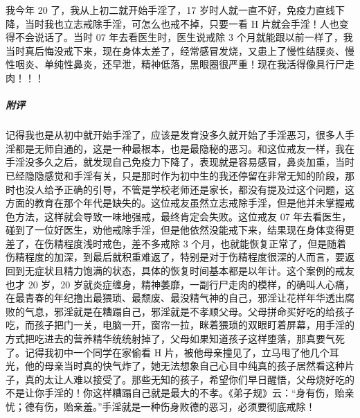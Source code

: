 \begin{case}
    我今年 20 了，我从上初二就开始手淫了，17 岁时人就一直不好，免疫力直线下降，当时我也立志戒除手淫，可怎么也戒不掉，只要一看 H 片就会手淫！人也变得不会说话了。当时 07 年去看医生时，医生说戒除 3 个月就能跟以前一样了，我当时真后悔没戒下来，现在身体太差了，经常感冒发烧，又患上了慢性结膜炎、慢性咽炎、单纯性鼻炎，还早泄，精神低落，黑眼圈很严重！现在我活得像具行尸走肉！！！
    \subparagraph{附评} 记得我也是从初中就开始手淫了，应该是发育没多久就开始了手淫恶习，很多人手淫都是无师自通的，这是一种最根本，也是最隐秘的恶习。和这位戒友一样，我在手淫没多久之后，就发现自己免疫力下降了，表现就是容易感冒，鼻炎加重，当时已经隐隐感觉和手淫有关，只是那时作为初中生的我还停留在非常无知的阶段，那时也没人给予正确的引导，不管是学校老师还是家长，都没有提及过这个问题，这方面的教育在那个年代是缺失的。这位戒友虽然立志戒除手淫，但是他并未掌握戒色方法，这样就会导致一味地强戒，最终肯定会失败。这位戒友 07 年去看医生，碰到了一位好医生，劝他戒除手淫，但是他依然没能戒下来，结果现在身体变得更差了，在伤精程度浅时戒色，差不多戒除 3 个月，也就能恢复正常了，但是随着伤精程度的加深，到最后就积重难返了，特别是对于伤精程度很深的人而言，要返回到无症状且精力饱满的状态，具体的恢复时间基本都是以年计。这个案例的戒友也才 20 岁，20 岁就炎症缠身，精神萎靡，一副行尸走肉的模样，的确叫人心痛，在最青春的年纪撸出最猥琐、最颓废、最没精气神的自己，邪淫让花样年华透出腐败的气息，邪淫就是在糟蹋自己，邪淫就是不孝顺父母。父母拼命买好吃的给孩子吃，而孩子把门一关，电脑一开，窗帘一拉，眯着猥琐的双眼盯着屏幕，用手淫的方式把吃进去的营养精华统统射掉了，父母如果知道孩子这样堕落，那真要气死了。记得我初中一个同学在家偷看 H 片，被他母亲撞见了，立马甩了他几个耳光，他的母亲当时真的快气炸了，她无法想象自己心目中纯真的孩子居然看这种片子，真的太让人难以接受了。那些无知的孩子，希望你们早日醒悟，父母烧好吃的不是让你手淫的！你这样糟蹋自己就是最大的不孝。《弟子规》云：“身有伤，贻亲忧；德有伤，贻亲羞。”手淫就是一种伤身败德的恶习，必须要彻底戒除！
\end{case}

